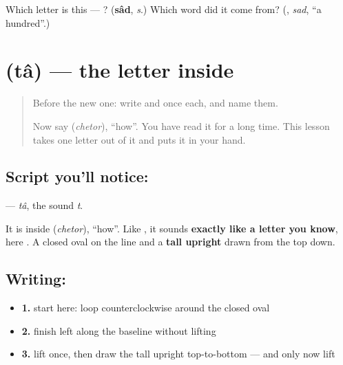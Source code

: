 \begin{tcolorbox}[breakable,colback=teal!4,colframe=teal!35!black,title={Before you move on}]
Which letter is this — ? (\textbf{sâd}, \emph{s}.) Which word did it come from? (\textbf{}, \emph{sad}, \textquotedblleft{}a hundred\textquotedblright{}.)
\end{tcolorbox}
\section[\texorpdfstring{\fa{ط} (tâ)}{ط (tâ)}]{ (tâ) — the letter inside }

\label{lesson:FA-W25-ta}



\begin{quote}
Before the new one: write  and  once each, and name them.

Now say \textbf{} (\emph{chetor}), \textquotedblleft{}how\textquotedblright{}. You have read it for a long time. This lesson takes one letter out of it and puts it in your hand.
\end{quote}

\subsection*{Script you'll notice: }
\textbf{} — \emph{tâ}, the sound \emph{t}.

It is inside \textbf{} (\emph{chetor}), \textquotedblleft{}how\textquotedblright{}. Like \textbf{}, it sounds \textbf{exactly like a letter you know}, here \textbf{}. A closed oval on the line and a \textbf{tall upright} drawn from the top down.

\subsection*{Writing: }

\begin{itemize}
\raggedright
  \item \textbf{1.} start here: loop counterclockwise around the closed oval
  \item \textbf{2.} finish left along the baseline without lifting
  \item \textbf{3.} lift once, then draw the tall upright top-to-bottom — and only now lift
\end{itemize}

